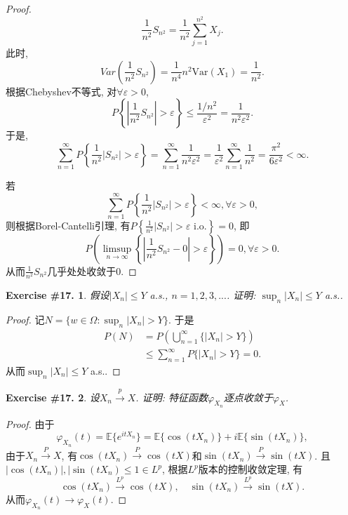 \documentclass[UTF8, a4paper]{article}
\newtheorem{exercise}{Exercise \#17.}
\begin{document}
\begin{proof}

$$
\frac{1}{n^2} S_{n^2} = \frac{1}{n^2} \sum_{j=1}^{n^2} X_j .
$$
此时, 
$$
Var\left(\frac{1}{n^2} S_{n^2}\right) = \frac{1}{n^4} n^2 \text{Var}(X_1) = \frac{1}{n^2}.
$$
根据Chebyshev不等式, 对\(\forall \varepsilon > 0\),
$$
P\left\{\left|\frac{1}{n^2}S_{n^2}\right| > \varepsilon\right\} \leq \frac{1/n^2}{\varepsilon^2} = \frac{1}{n^2\varepsilon^2}.
$$
于是, 
$$
\sum_{n=1}^{\infty}P\left\{\frac{1}{n^2}|S_{n^2}| > \varepsilon\right\} = \sum_{n=1}^{\infty} \frac{1}{n^2\varepsilon^2} = \frac{1}{\varepsilon^2}\sum_{n=1}^{\infty} \frac{1}{n^2} = \frac{\pi^2}{6\varepsilon^2} < \infty.
$$


若
$$
\sum_{n=1}^{\infty}P\left\{\frac{1}{n^2}|S_{n^2}| > \varepsilon\right\} < \infty, \forall \varepsilon > 0,
$$
则根据Borel-Cantelli引理, 有\(P\left\{\frac{1}{n^2}|S_{n^2}| > \varepsilon \text{ i.o.}\right\} = 0\), 即
$$
P\left(\limsup_{n\to\infty} \left\{\left|\frac{1}{n^2}S_{n^2} - 0\right| > \varepsilon\right\}\right) = 0, \forall \varepsilon > 0.
$$
从而\(\frac{1}{n^2}S_{n^2}\)几乎处处收敛于\(0\).
\end{proof}


\begin{framed}
\begin{exercise}
假设\(|X_n| \leq Y\) a.s., \(n = 1,2,3,...\).
证明: \(\sup_{n}|X_n| \leq Y\) a.s..
\end{exercise}
\end{framed}

\begin{proof}
记\(N = \{w\in \Omega: \sup_n|X_n| > Y\}\).  于是
$$
\begin{aligned}
    P(N) &= P\left(\bigcup_{n=1}^{\infty}\{|X_n| > Y\}\right) \\
    &\leq \sum_{n=1}^{\infty}P\{|X_n| > Y\} = 0.
\end{aligned}
$$
从而\(\sup_{n}|X_n| \leq Y\) a.s..
\end{proof}


\begin{framed}
\begin{exercise}
设\(X_n \overset{p}{\to} X\). 证明: 特征函数\(\varphi_{X_n}\)逐点收敛于\(\varphi_X\).
\end{exercise}
\end{framed}

\begin{proof}
由于 
$$
\varphi_{X_n}(t) = \mathbb{E}\{e^{itX_n}\} = \mathbb{E}\{\cos(tX_n)\} + i\mathbb{E}\{\sin(tX_n)\},
$$
由于\(X_n \xrightarrow{P} X\), 有\(\cos(tX_n) \xrightarrow{P} \cos(tX)\)和\(\sin(tX_n) \xrightarrow{P} \sin(tX)\). 
且\(|\cos(tX_n)|, |\sin(tX_n) \leq 1 \in L^p\), 根据\(L^p\)版本的控制收敛定理, 有
$$
\cos(tX_n) \xrightarrow{L^p} \cos(tX), \quad \sin(tX_n) \xrightarrow{L^p} \sin(tX).
$$
从而\(\varphi_{X_n}(t) \to \varphi_X(t)\).
\end{proof}
\end{document}
